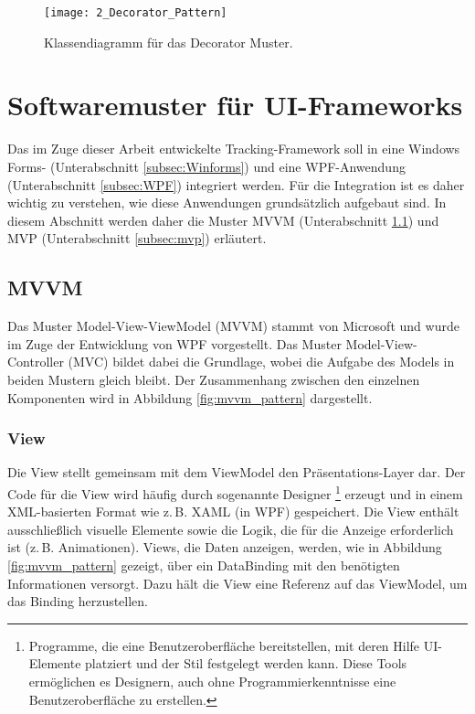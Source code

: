 \begin{figure}[H]
\centering
\texttt{[image: 2\_Decorator\_Pattern]}
\caption{Klassendiagramm für das Decorator Muster.}
\label{fig:decorator_pattern}
\end{figure}

\section{Softwaremuster für UI-Frameworks}
\label{subsec:patterns}

Das im Zuge dieser Arbeit entwickelte Tracking-Framework soll in eine Windows Forms- (Unterabschnitt \ref{subsec:Winforms}) und eine WPF-Anwendung (Unterabschnitt \ref{subsec:WPF}) integriert werden. 
Für die Integration ist es daher wichtig zu verstehen, wie diese Anwendungen grundsätzlich aufgebaut sind. 
In diesem Abschnitt werden daher die Muster MVVM (Unterabschnitt \ref{subsec:mvvm}) und MVP (Unterabschnitt \ref{subsec:mvp}) erläutert.

\subsection{MVVM}
\label{subsec:mvvm}

Das Muster Model-View-ViewModel (MVVM) \cite{Gossman2005MVVM} stammt von Microsoft und wurde im Zuge der Entwicklung von WPF vorgestellt. 
Das Muster Model-View-Controller (MVC) \cite{Krasner1988MVC} bildet dabei die Grundlage, wobei die Aufgabe des Models in beiden Mustern gleich bleibt. 
Der Zusammenhang zwischen den einzelnen Komponenten wird in Abbildung \ref{fig:mvvm_pattern} dargestellt.

\subsubsection{View}
Die View stellt gemeinsam mit dem ViewModel den Präsentations-Layer dar. Der Code für die View wird häufig durch sogenannte Designer \footnote{Programme, die eine Benutzeroberfläche bereitstellen, mit deren Hilfe UI-Elemente platziert und der Stil festgelegt werden kann. 
Diese Tools ermöglichen es Designern, auch ohne Programmierkenntnisse eine Benutzeroberfläche zu erstellen.} erzeugt und in einem XML-basierten Format wie z.\,B. XAML (in WPF) gespeichert. Die View enthält ausschließlich visuelle Elemente sowie die Logik, die für die Anzeige erforderlich ist (z.\,B. Animationen). Views, die Daten anzeigen, werden, wie in Abbildung \ref{fig:mvvm_pattern} gezeigt, über ein DataBinding mit den benötigten Informationen versorgt. Dazu hält die View eine Referenz auf das ViewModel, um das Binding herzustellen.

